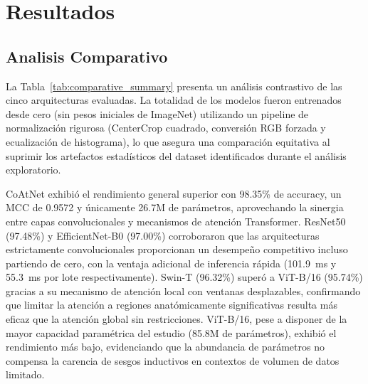 \section{Resultados}
\label{sec:results}


\FloatBarrier

\FloatBarrier

\FloatBarrier

\FloatBarrier


\subsection{Analisis Comparativo}

La Tabla~\ref{tab:comparative_summary} presenta un análisis contrastivo de las cinco arquitecturas evaluadas. La totalidad de los modelos fueron entrenados desde cero (sin pesos iniciales de ImageNet) utilizando un pipeline de normalización rigurosa (CenterCrop cuadrado, conversión RGB forzada y ecualización de histograma), lo que asegura una comparación equitativa al suprimir los artefactos estadísticos del dataset identificados durante el análisis exploratorio.

CoAtNet exhibió el rendimiento general superior con 98.35\% de accuracy, un MCC de 0.9572 y únicamente 26.7M de parámetros, aprovechando la sinergia entre capas convolucionales y mecanismos de atención Transformer. ResNet50 (97.48\%) y EfficientNet-B0 (97.00\%) corroboraron que las arquitecturas estrictamente convolucionales proporcionan un desempeño competitivo incluso partiendo de cero, con la ventaja adicional de inferencia rápida (101.9~ms y 55.3~ms por lote respectivamente). Swin-T (96.32\%) superó a ViT-B/16 (95.74\%) gracias a su mecanismo de atención local con ventanas desplazables, confirmando que limitar la atención a regiones anatómicamente significativas resulta más eficaz que la atención global sin restricciones. ViT-B/16, pese a disponer de la mayor capacidad paramétrica del estudio (85.8M de parámetros), exhibió el rendimiento más bajo, evidenciando que la abundancia de parámetros no compensa la carencia de sesgos inductivos en contextos de volumen de datos limitado.

